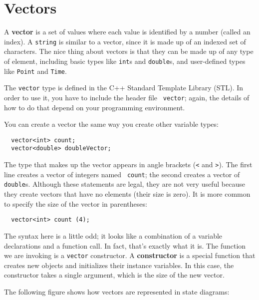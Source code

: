 

\chapter{Vectors}
\label{vectors}

A {\bf vector} is a set of values where each value is identified by a
number (called an index).  A {\tt string} is similar to a vector,
since it is made up of an indexed set of characters.  The nice thing
about vectors is that they can be made up of any type of element,
including basic types like {\tt int}s and {\tt double}s, 
and user-defined types like {\tt Point} and {\tt Time}.

The {\tt vector} type is defined in the C++ Standard Template Library (STL).
In order to use it, you have to include the header file {\tt
vector}; again, the details of how to do that depend on your
programming environment.

You can create a vector the same way you create other variable types:

\begin{verbatim}
  vector<int> count;
  vector<double> doubleVector;
\end{verbatim}
%
The type that makes up the vector appears in angle brackets ({\tt <}
and {\tt >}).  The first line creates a vector of integers named {\tt
count}; the second creates a vector of {\tt double}s.  Although these
statements are legal, they are not very useful because they create
vectors that have no elements (their size is zero).  It is more
common to specify the size of the vector in parentheses:

\begin{verbatim}
  vector<int> count (4);
\end{verbatim}
%
The syntax here is a little odd; it looks like a combination of a
variable declarations and a function call.  In fact, that's exactly
what it is.  The function we are invoking is a {\tt vector}
constructor.  A {\bf constructor} is a special function that creates
new objects and initializes their instance variables.  In this case,
the constructor takes a single argument, which is the size of the new
vector.


The following figure shows how vectors are represented in state
diagrams:

\vspace{0.1in}
\centerline{}
\vspace{0.1in}

